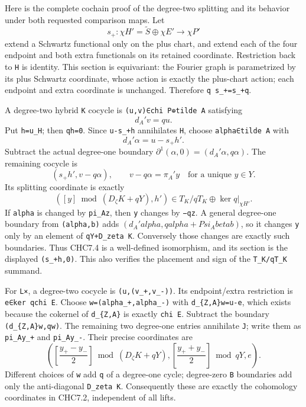 Here is the complete cochain proof of the degree-two splitting and its
behavior under both requested comparison maps. Let \[
s_+:\chi H'=\widetilde S\oplus\chi E'\longrightarrow\chi P'
\] extend a Schwartz functional only on the plus chart, and extend each
of the four endpoint and both extra functionals on its retained
coordinate. Restriction back to \texttt{H} is identity. This section is
equivariant: the Fourier graph is parametrized by its plus Schwartz
coordinate, whose action is exactly the plus-chart action; each endpoint
and extra coordinate is unchanged. Therefore \texttt{q\ s\_+=s\_+q}.

A degree-two hybrid \texttt{K} cocycle is
\texttt{(u,v)∈chi\ P\textquotesingle{}⊕tilde\ A} satisfying \[
d_A'v=q u.
\] Put \texttt{h\textquotesingle{}=u\textbar{}\_H}; then
\texttt{qh\textquotesingle{}=0}. Since
\texttt{u-s\_+h\textquotesingle{}} annihilates \texttt{H}, choose
\texttt{alpha∈tilde\ A} with \[
d_A'\alpha=u-s_+h'.
\] Subtract the actual degree-one boundary
\(\partial^1(\alpha,0)=(d_A'\alpha,q\alpha)\). The remaining cocycle is
\[
(s_+h',v-q\alpha),\qquad v-q\alpha=\pi_A'y
\quad\text{for a unique }y\in Y.
\] Its splitting coordinate is exactly \[
([y]\bmod(D_\zeta K+qY),h')
\in T_K/qT_K\oplus\ker q|_{\chi H'}.
\tag{CHC7.4}
\] If \texttt{alpha} is changed by \texttt{pi\_A\textquotesingle{}z},
then \texttt{y} changes by \texttt{−qz}. A general degree-one boundary
from \texttt{(alpha,b)} adds \((d_A'alpha,qalpha+Psi_A beta b)\), so it
changes \texttt{y} only by an element of \texttt{qY+D\_zeta\ K}.
Conversely those changes are exactly such boundaries. Thus CHC7.4 is a
well-defined isomorphism, and its section is the displayed
\texttt{(s\_+h\textquotesingle{},0)}. This also verifies the placement
and sign of the \texttt{T\_K/qT\_K} summand.

For \texttt{L×}, a degree-two cocycle is \texttt{(u,(v\_+,v\_-))}. Its
endpoint/extra restriction is
\texttt{e∈ker\ q\textbar{}chi\ E\textquotesingle{}}. Choose
\texttt{w=(alpha\_+,alpha\_-)} with
\texttt{d\_\{Z,A\}\textquotesingle{}w=u-e}, which exists because the
cokernel of \texttt{d\_\{Z,A\}\textquotesingle{}} is exactly
\texttt{chi\ E\textquotesingle{}}. Subtract the boundary
\texttt{(d\_\{Z,A\}\textquotesingle{}w,qw)}. The remaining two
degree-one entries annihilate \texttt{J}; write them as
\texttt{pi\_A\textquotesingle{}y\_+} and
\texttt{pi\_A\textquotesingle{}y\_-}. Their precise coordinates are \[
\left(\left[\frac{y_+-y_-}{2}\right]\bmod(D_\zeta K+qY),
\left[\frac{y_++y_-}{2}\right]\bmod qY,e\right).
\tag{CHC7.5}
\] Different choices of \texttt{w} add \texttt{q} of a degree-one cycle;
degree-zero \texttt{B} boundaries add only the anti-diagonal
\texttt{D\_zeta\ K}. Consequently these are exactly the cohomology
coordinates in CHC7.2, independent of all lifts.

